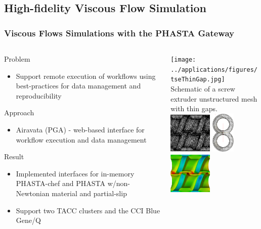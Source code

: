 \documentclass{beamer}
\begin{document}
\subsection{High-fidelity Viscous Flow Simulation}
\begin{frame}
  \frametitle{Viscous Flows Simulations with the PHASTA Gateway}
  \begin{columns}
    \begin{column}{0.5\textwidth}
      Problem
      \begin{itemize}
        \item Support remote execution of workflows using
          best-practices for data management and reproducibility
      \end{itemize}
      Approach
      \begin{itemize}
        \item Airavata (PGA) - web-based interface for workflow execution and
          data management
      \end{itemize}
      Result
      \begin{itemize}
        \item Implemented interfaces for in-memory PHASTA-chef and PHASTA
          w/non-Newtonian material and partial-slip
        \item Support two TACC clusters and the CCI Blue Gene/Q
      \end{itemize}
    \end{column}
    \begin{column}{0.5\textwidth}
      \centering
      \texttt{[image: ../applications/figures/tseThinGap.jpg]}\\
      \small
      Schematic of a screw extruder unstructured mesh with thin gaps.\\
      \includegraphics[height=2.0cm,keepaspectratio]{../applications/figures/tseMeshTwoThreads.png}
      \includegraphics[height=2.0cm,keepaspectratio]{../applications/figures/tseMeshCrossSection.png}\\
      \includegraphics[height=2.0cm,keepaspectratio]{../applications/figures/tseFlowTwoThreads.png}

\end{column}
\end{columns}
\end{frame}
\end{document}
